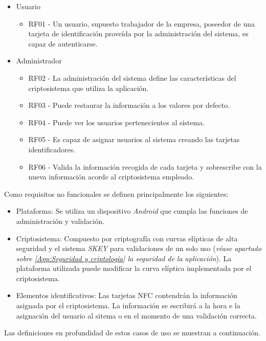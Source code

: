 \documentclass[../PFC.tex]{subfiles}
\begin{document}
\begin{itemize}
\item{Usuario}
	\begin{itemize}
	\item{RF01 - Un usuario, supuesto trabajador de la empresa, poseedor de una tarjeta de identificación proveída por la administración del sistema, es capaz de autenticarse.}
	\end{itemize}
\item{Administrador}
	\begin{itemize}
	\item{RF02 - La administración del sistema define las características del criptosistema que utiliza la aplicación.}
	\item{RF03 - Puede restaurar la información a los valores por defecto.}
	\item{RF04 - Puede ver los usuarios pertenecientes al sistema.}
	\item{RF05 - Es capaz de asignar usuarios al sistema creando las tarjetas identificadores.}
	\item{RF06 - Valida la información recogida de cada tarjeta y sobrescribe con la nueva información acorde al criptosistema empleado.}
	\end{itemize}
\end{itemize}

Como requisitos no funcionales se definen principalmente los siguientes:

\begin{itemize}
\item{Plataforma: Se utiliza un dispositivo \textit{Android} que cumpla las funciones de administración y validación.}
\item{Criptosistema: Compuesto por criptografía con curvas elípticas de alta seguridad y el sistema \textit{SKEY} para validaciones de un solo uso (\textit{véase apartado sobre \ref{App:Seguridad y criptología} la seguridad de la aplicación}). La plataforma utilizada puede modificar la curva elíptica implementada por el criptosistema.}
\item{Elementos identificativos: Las tarjetas NFC contendrán la información asignada por el criptosistema. La información se escribirá a la hora e la asignación del usuario al sitema o en el momento de una validación correcta.}
\end{itemize}

Las definiciones en profundidad de estos casos de uso se muestran a continuación.
\end{document}

